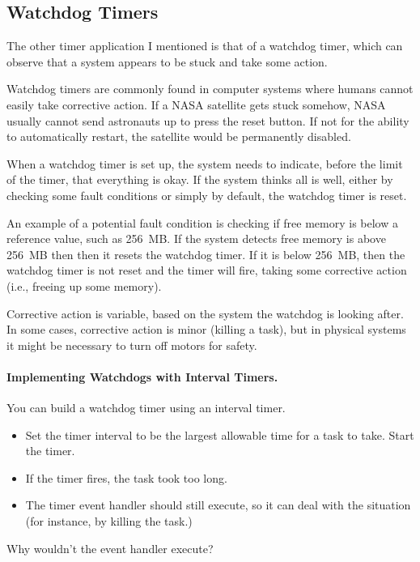 \subsection*{Watchdog Timers} The other timer application I mentioned
is that of a watchdog timer, which can observe that a system appears to
be stuck and take some action.

Watchdog timers are commonly found in computer systems where humans cannot easily take corrective action. If a NASA satellite gets stuck somehow, NASA usually cannot send astronauts up to press the reset button. If not for the ability to automatically restart, the satellite would be permanently disabled.

When a watchdog timer is set up, the system needs to indicate, before the limit of the timer, that everything is okay. If the system thinks all is well, either by checking some fault conditions or simply by default, the watchdog timer is reset. 

An example of a potential fault condition is checking if free memory is below a reference value, such as 256~MB. If the system detects free memory is above 256~MB then then it resets the watchdog timer. If it is below 256~MB, then the watchdog timer is not reset and the timer will fire, taking some corrective action (i.e., freeing up some memory).

Corrective action is variable, based on the system the watchdog is looking after. In some cases, corrective action is minor (killing a task), but in physical systems it might be necessary to turn off motors for safety. 

\paragraph{Implementing Watchdogs with Interval Timers.}
You can build a watchdog timer using an interval timer.
\begin{itemize}
\item Set the timer interval to be the largest allowable time for a task
to take. Start the timer.
\item If the timer fires, the task took too long.
\item The timer event handler should still execute, so it can deal with
the situation (for instance, by killing the task.)
\end{itemize}

{\sf Why wouldn't the event handler execute?}\\[2em]

